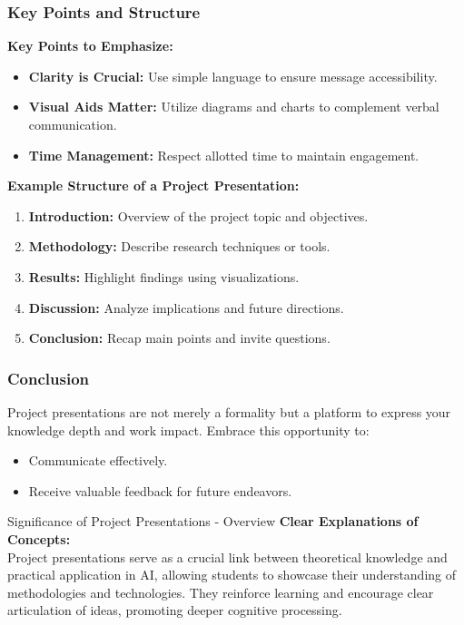\documentclass[aspectratio=169]{beamer}
\begin{document}
\begin{frame}[fragile]
    \frametitle{Key Points and Structure}
    \textbf{Key Points to Emphasize:}
    \begin{itemize}
        \item \textbf{Clarity is Crucial:} Use simple language to ensure message accessibility.
        \item \textbf{Visual Aids Matter:} Utilize diagrams and charts to complement verbal communication.
        \item \textbf{Time Management:} Respect allotted time to maintain engagement.
    \end{itemize}

    \textbf{Example Structure of a Project Presentation:}
    \begin{enumerate}
        \item \textbf{Introduction:} Overview of the project topic and objectives.
        \item \textbf{Methodology:} Describe research techniques or tools.
        \item \textbf{Results:} Highlight findings using visualizations.
        \item \textbf{Discussion:} Analyze implications and future directions.
        \item \textbf{Conclusion:} Recap main points and invite questions.
    \end{enumerate}
\end{frame}

\begin{frame}[fragile]
    \frametitle{Conclusion}
    Project presentations are not merely a formality but a platform to express your knowledge depth and work impact. Embrace this opportunity to:
    \begin{itemize}
        \item Communicate effectively.
        \item Receive valuable feedback for future endeavors.
    \end{itemize}
\end{frame}

\begin{frame}[fragile]{Significance of Project Presentations - Overview}
    \textbf{Clear Explanations of Concepts:} \\
    Project presentations serve as a crucial link between theoretical knowledge and practical application in AI, allowing students to showcase their understanding of methodologies and technologies. They reinforce learning and encourage clear articulation of ideas, promoting deeper cognitive processing.
\end{frame}
\end{document}
